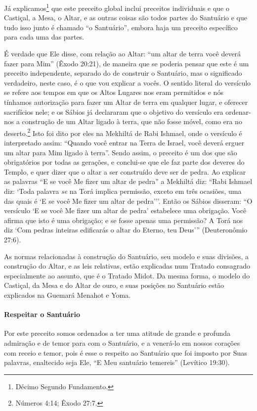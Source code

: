 Já explicamos\footnote{Décimo Segundo Fundamento.} que este preceito global inclui
preceitos individuais e que o Castiçal, a Mesa, o Altar, e as outras coisas são todos partes do Santuário e que tudo isso junto é chamado ``o Santuário'', embora
haja um preceito específico para cada uma das partes.

É verdade que Ele disse, com relação ao Altar: ``um altar de terra você
deverá fazer para Mim'' (Êxodo 20:21), de maneira que se poderia pensar
que este é um preceito independente, separado do de construir o
Santuário, mas o significado verdadeiro, neste caso, é o que vou
explicar a vocês. O sentido literal do versículo se refere aos tempos
em que os Altos Lugares nos eram permitidos e nós tínhamos autorização
para fazer um Altar de terra em qualquer lugar, e oferecer sacrifícios
nele; e os Sábios já declararam que o objetivo do versículo era
ordenar-nos a construção de um Altar ligado à terra, que não fosse
móvel, como era no deserto.\footnote{Números 4:14; Êxodo 27:7.} Isto foi dito por eles
na Mekhiltá de Rabi Ishmael, onde o versículo é interpretado assim:
``Quando você entrar na Terra de Israel, você deverá erguer um altar
para Mim ligado à terra''. Sendo assim, o preceito é um dos que são
obrigatórios por todas as gerações, e conclui-se que ele faz parte dos
deveres do Templo, e quer dizer que o altar a ser construído deve ser
de pedra. Ao explicar as palavras ``E se você Me fizer um altar de
pedra'' a Mekhiltá diz: ``Rabi Ishmael diz: `Toda palavra \emph{se} na
Torá implica permissão, exceto em três ocasiões, uma das quais é `E se
você Me fizer um altar de pedra'''. Então os Sábios disseram: ``O
versículo `E se você Me fizer um altar de pedra' estabelece uma
obrigação. Você afirma que isto é uma obrigação; e se fosse apenas uma
permissão? A Torá nos diz `Com pedras inteiras edificarás o altar do
Eterno, teu Deus''' (Deuteronômio 27:6).

As normas relacionadas à construção do Santuário, seu modelo e suas
divisões, a construção do Altar, e as leis relativas, estão explicadas
num Tratado consagrado especialmente ao assunto, que é o Tratado Midot.
Da mesma forma, o modelo do Castiçal, da Mesa e do Altar de ouro, e suas
posições no Santuário estão explicados na Guemará Menahot e Yoma.

\paragraph{Respeitar o Santuário}

Por este preceito somos ordenados a ter uma atitude de grande e profunda
admiração e de temor para com o Santuário, e a venerá-lo em nossos
corações com receio e temor, pois é esse o respeito ao Santuário que foi
imposto por Suas palavras, enaltecido seja Ele, ``E Meu santuário
temereis'' (Levítico 19:30).

